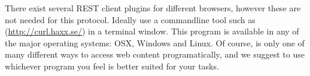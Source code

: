 %
There exist several REST client plugins for different browsers, however these
are not needed for this protocol. Ideally use a commandline tool such as
 (\url{http://curl.haxx.se/}) in a terminal window. This program is
available in any of the major operating systems: OSX, Windows and Linux. Of
course,  is only one of many different ways to access web content
programatically, and we suggest to use whichever program you feel is
better suited for your tasks.

